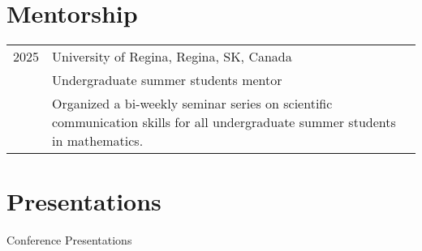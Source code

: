 \documentclass[letter,12pt]{article} %
\begin{document}
\section{Mentorship}
\vspace{3mm}
{\raggedleft
\begin{tabular}{r | p{13.5cm}}
 2025 &University of Regina, Regina, SK, Canada  \\
& Undergraduate summer students mentor  \\
&Organized a bi-weekly seminar series on scientific communication skills for all undergraduate summer students in mathematics.\\
\end{tabular}}

\pagebreak
\section{Presentations}
\vspace{3mm}

{\large Conference Presentations}
\end{document}
